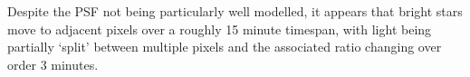 Despite the PSF not being particularly well modelled, it appears that bright stars move to adjacent pixels over a roughly 15 minute timespan, with light being partially `split' between multiple pixels and the associated ratio changing over order 3 minutes.
\begin{figure}[t!]
\begin{minipage}{\linewidth}\centering
{}

\end{minipage}
\end{figure}
